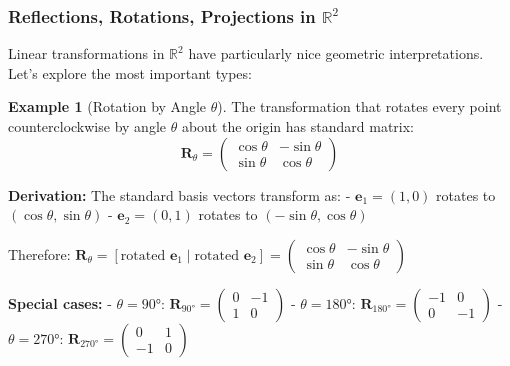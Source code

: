\documentclass[12pt]{article}
\numberwithin{equation}{section}
\newcommand{\RR}{\mathbb{R}}
\newcommand{\vect}[1]{\boldsymbol{#1}}   %
\newcommand{\mat}[1]{\mathbf{#1}}        %
\theoremstyle{plain}
\theoremstyle{definition}
\newtheorem{example}[theorem]{Example}
\theoremstyle{remark}
\begin{document}
\subsubsection{Reflections, Rotations, Projections in $\RR^2$}

Linear transformations in $\RR^2$ have particularly nice geometric interpretations. Let's explore the most important types:

\begin{example}[Rotation by Angle $\theta$]
The transformation that rotates every point counterclockwise by angle $\theta$ about the origin has standard matrix:
$$\mat{R}_\theta = \begin{pmatrix} \cos\theta & -\sin\theta \\ \sin\theta & \cos\theta \end{pmatrix}$$

\textbf{Derivation:} The standard basis vectors transform as:
- $\vect{e}_1 = (1,0)$ rotates to $(\cos\theta, \sin\theta)$
- $\vect{e}_2 = (0,1)$ rotates to $(-\sin\theta, \cos\theta)$

Therefore: $\mat{R}_\theta = [\text{rotated } \vect{e}_1 \mid \text{rotated } \vect{e}_2] = \begin{pmatrix} \cos\theta & -\sin\theta \\ \sin\theta & \cos\theta \end{pmatrix}$

\textbf{Special cases:}
- $\theta = 90°$: $\mat{R}_{90°} = \begin{pmatrix} 0 & -1 \\ 1 & 0 \end{pmatrix}$
- $\theta = 180°$: $\mat{R}_{180°} = \begin{pmatrix} -1 & 0 \\ 0 & -1 \end{pmatrix}$
- $\theta = 270°$: $\mat{R}_{270°} = \begin{pmatrix} 0 & 1 \\ -1 & 0 \end{pmatrix}$
\end{example}
\end{document}
